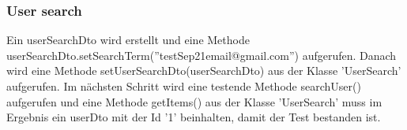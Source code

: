 \documentclass{article}
\begin{document}
\subsubsection{User search}
Ein userSearchDto wird erstellt und eine Methode \linebreak userSearchDto.setSearchTerm(''testSep21email@gmail.com'') aufgerufen. Danach wird eine Methode setUserSearchDto(userSearchDto) aus der Klasse 'UserSearch' aufgerufen. Im nächsten Schritt wird eine testende Methode searchUser() aufgerufen und eine Methode getItems() aus der Klasse 'UserSearch' muss im Ergebnis ein userDto mit der Id '1' beinhalten, damit der Test bestanden ist. 
\end{document}
